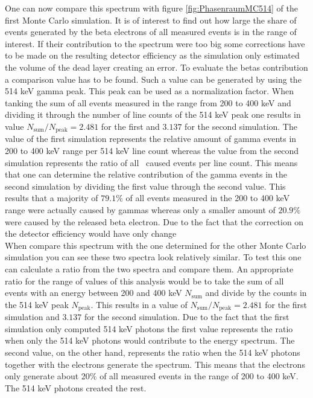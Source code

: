 One can now compare this spectrum with figure \ref{fig:PhasenraumMC514} of the first Monte Carlo simulation.
It is of interest to find out how large the share of events generated by the beta electrons of all measured events is in the range of interest.
If their contribution to the spectrum were too big some corrections have to be made on the resulting detector efficiency as the simulation only estimated the volume of the dead layer creating an error.
To evaluate the betas contribution a comparison value has to be found.
Such a value can be generated by using the 514 keV gamma peak.
This peak can be used as a normalization factor.
When tanking the sum of all events measured in the range from 200 to 400 keV and dividing it through the number of line counts of the 514 keV peak one results in value $N_{\mathrm{sum}}/N_{\mathrm{peak}} = 2.481$ for the first and $3.137$  for the second simulation.
The value of the first simulation represents the relative amount of gamma events in 200 to 400 keV range per 514 keV line count whereas the value from the second simulation represents the ratio of all \Kr\ caused events per line count.
This means that one can determine the relative contribution of the gamma events in the second simulation by dividing the first value through the second value.
This results that a majority of $79.1 \%$ of all events measured in the 200 to 400 keV range were actually caused by gammas whereas only a smaller amount of $20.9 \%$ were caused by the released beta electron.
Due to the fact that the correction on the detector efficiency would have only change
\\

When compare this spectrum with the one determined for the other Monte Carlo simulation you can see these two spectra look relatively similar.
To test this one can calculate a ratio from the two spectra and compare them.
An appropriate ratio for the range of values of this analysis would be to take the sum of all events with an energy between 200 and 400 keV $N_{\mathrm{sum}}$ and divide by the counts in the 514 keV peak $N_ {\mathrm{peak}}$.
This results in a value of $N_{\mathrm{sum}}/N_{\mathrm{peak}} = 2.481$ for the first simulation and $3.137$ for the second simulation.
Due to the fact that the first simulation only computed 514 keV photons the first value represents the ratio when only the 514 keV photons would contribute to the energy spectrum.
The second value, on the other hand, represents the ratio when the 514 keV photons together with the electrons generate the spectrum.
This means that the electrons only generate about 20$\%$ of all measured events in the range of 200 to 400 keV.
The 514 keV photons created the rest.
\\

